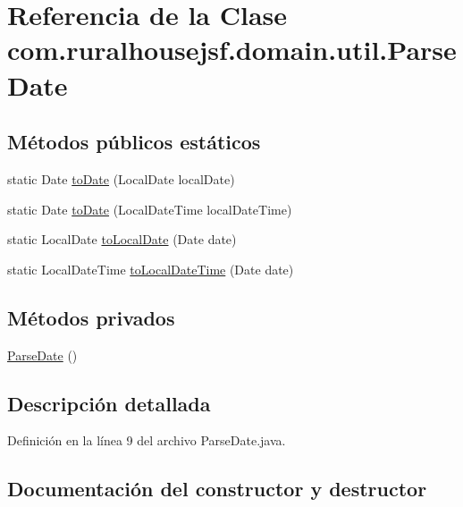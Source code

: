 \hypertarget{a00196}{}\section{Referencia de la Clase com.\+ruralhousejsf.\+domain.\+util.\+Parse\+Date}
\label{a00196}
\subsection*{Métodos públicos estáticos}
\begin{DoxyCompactItemize}
\item 
static Date \mbox{\hyperlink{a00196_a3a918df6cf2d9658332d7d5bee975d58}{to\+Date}} (Local\+Date local\+Date)
\item 
static Date \mbox{\hyperlink{a00196_ade5cf2cc6741490bf01834ac0ebf9dfe}{to\+Date}} (Local\+Date\+Time local\+Date\+Time)
\item 
static Local\+Date \mbox{\hyperlink{a00196_ab162361ec67bde08f594d22c04ccc283}{to\+Local\+Date}} (Date date)
\item 
static Local\+Date\+Time \mbox{\hyperlink{a00196_aacf06ccd03aba32238d32068f0fe1ca2}{to\+Local\+Date\+Time}} (Date date)
\end{DoxyCompactItemize}
\subsection*{Métodos privados}
\begin{DoxyCompactItemize}
\item 
\mbox{\hyperlink{a00196_a170ecbdf94e64b84ee7b7a7013a046ea}{Parse\+Date}} ()
\end{DoxyCompactItemize}


\subsection{Descripción detallada}


Definición en la línea 9 del archivo Parse\+Date.\+java.



\subsection{Documentación del constructor y destructor}
\mbox{\label{a00196_a170ecbdf94e64b84ee7b7a7013a046ea}} 
